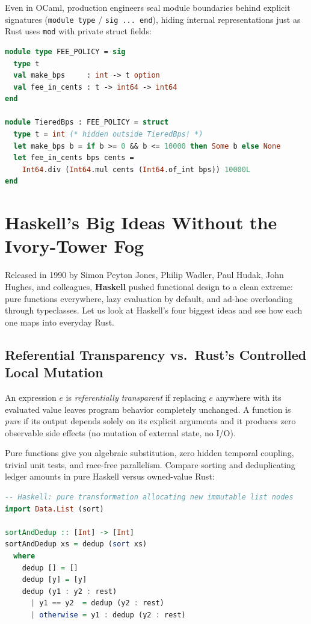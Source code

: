 Even in OCaml, production engineers seal module boundaries behind explicit signatures
(\texttt{module type} / \texttt{sig ... end}), hiding internal representations just as
Rust uses \texttt{mod} with private struct fields:

\begin{lstlisting}[language=OCaml]
module type FEE_POLICY = sig
  type t
  val make_bps     : int -> t option
  val fee_in_cents : t -> int64 -> int64
end

module TieredBps : FEE_POLICY = struct
  type t = int (* hidden outside TieredBps! *)
  let make_bps b = if b >= 0 && b <= 10000 then Some b else None
  let fee_in_cents bps cents =
    Int64.div (Int64.mul cents (Int64.of_int bps)) 10000L
end
\end{lstlisting}

\section{Haskell's Big Ideas Without the Ivory-Tower Fog}
\label{ch07:haskell-ideas}

Released in 1990 by Simon Peyton Jones, Philip Wadler, Paul Hudak, John Hughes, and
colleagues, \textbf{Haskell} pushed functional design to a clean extreme: pure
functions everywhere, lazy evaluation by default, and ad-hoc overloading through
typeclasses. Let us look at Haskell's four biggest ideas and see
how each one maps into everyday Rust.

\subsection{Referential Transparency vs.\ Rust's Controlled Local Mutation}

\begin{definition}
\label{ch07:def-referential-transparency}
An expression $e$ is \emph{referentially transparent} if replacing $e$ anywhere with
its evaluated value leaves program behavior completely unchanged. A function is
\emph{pure} if its output depends solely on its explicit arguments and it produces
zero observable side effects (no mutation of external state, no I/O).
\end{definition}

Pure functions give you algebraic substitution, zero hidden temporal coupling, trivial
unit tests, and race-free parallelism. Compare sorting and deduplicating ledger
amounts in pure Haskell versus owned-value Rust:

\begin{lstlisting}[language=Haskell]
-- Haskell: pure transformation allocating new immutable list nodes
import Data.List (sort)

sortAndDedup :: [Int] -> [Int]
sortAndDedup xs = dedup (sort xs)
  where
    dedup [] = []
    dedup [y] = [y]
    dedup (y1 : y2 : rest)
      | y1 == y2  = dedup (y2 : rest)
      | otherwise = y1 : dedup (y2 : rest)
\end{lstlisting}

